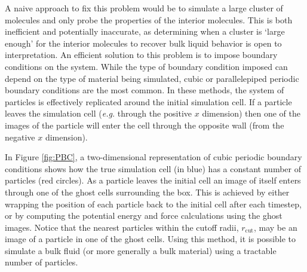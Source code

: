 A naive approach to fix this problem would be to simulate a large
cluster of molecules and only probe the properties of the interior
molecules. This is both inefficient and potentially inaccurate, as
determining when a cluster is `large enough' for the interior
molecules to recover bulk liquid behavior is open to
interpretation. An efficient solution to this problem is to impose
boundary conditions on the system. While the type of boundary
condition imposed can depend on the type of material being simulated,
cubic or parallelepiped periodic boundary conditions are the most
common. In these methods, the system of particles is
effectively replicated around the initial simulation cell. If a
particle leaves the simulation cell (\textit{e.g.} through the
positive $x$ dimension) then one of the images of the particle will
enter the cell through the opposite wall (from the negative $x$
dimension).

In Figure \ref{fig:PBC}, a two-dimensional representation of cubic
periodic boundary conditions shows how the true simulation cell (in
blue) has a constant number of particles (red circles). As a particle
leaves the initial cell an image of itself enters through one of the
ghost cells surrounding the box. This is achieved by either wrapping
the position of each particle back to the initial cell after each
timestep, or by computing the potential energy and force calculations
using the ghost images. Notice that the nearest particles within the
cutoff radii, $r_{\mathrm{cut}}$, may be an image of a particle in one
of the ghost cells. Using this method, it is possible to simulate a
bulk fluid (or more generally a bulk material) using a tractable
number of particles.

